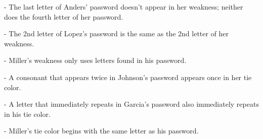 \documentclass{article}
\begin{document}
- The last letter of Anders’ password doesn’t appear in her weakness; neither does the fourth letter of her password.

- The 2nd letter of Lopez’s password is the same as the 2nd letter of her weakness.

- Miller’s weakness only uses letters found in his password.

- A consonant that appears twice in Johnson’s password appears once in her tie color.

- A letter that immediately repeats in Garcia’s password also immediately repeats in his tie color.

- Miller’s tie color begins with the same letter as his password.
\end{document}
